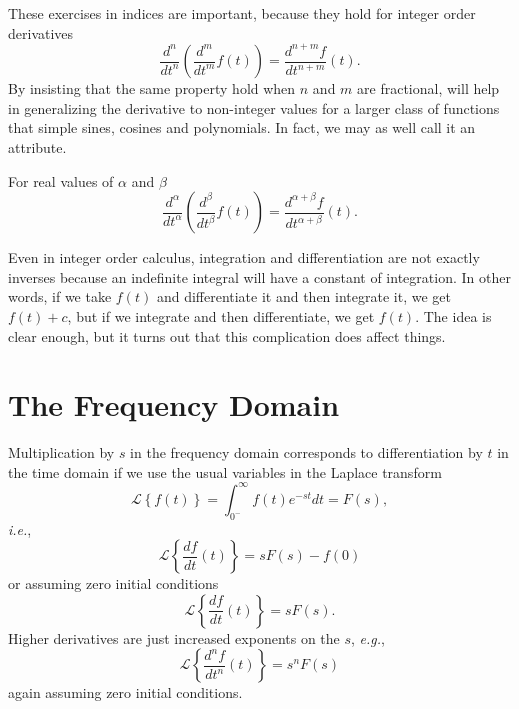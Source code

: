 These exercises in indices are important, because they hold for integer order derivatives
\begin{equation}
  \frac{d^n}{dt^n} \left( \frac{d^m}{dt^m} f(t) \right) = \frac{d^{n+m}f}{dt^{n+m}}(t).
\end{equation}
By insisting that the same property hold when $n$ and $m$ are fractional, will help in generalizing the derivative to non-integer values for a larger class of functions that simple sines, cosines and polynomials. In fact, we may as well call it an attribute.

\begin{attribute}
  For real values of $\alpha$ and $\beta$
  \begin{equation}
    \frac{d^\alpha}{dt^\alpha} \left( \frac{d^\beta}{dt^\beta} f(t) \right) = \frac{d^{\alpha + \beta}f}{dt^{\alpha + \beta}}(t).
    \label{eq:derivindices}
  \end{equation}
\end{attribute}

Even in integer order calculus, integration and differentiation are not exactly inverses because an indefinite integral will have a constant of integration. In other words, if we take $f(t)$ and differentiate it and then integrate it, we get $f(t) + c$, but if we integrate and then differentiate, we get $f(t)$. The idea is clear enough, but it turns out that this complication does affect things.


\section{The Frequency Domain}

Multiplication by $s$ in the frequency domain corresponds to differentiation by $t$ in the time domain if we use the
usual variables in the Laplace transform
\begin{equation}
  \mathcal{L} \left\{ f(t) \right\} = \int_{0^-}^\infty f(t) e^{-s t} dt = F(s),
\end{equation}
\textit{i.e.}, 
\begin{equation}
  \mathcal L \left\{ \frac{df}{dt}(t) \right\} = s F(s) - f(0)
\end{equation}
or assuming zero initial conditions
\begin{equation}
  \mathcal L \left\{ \frac{df}{dt}(t) \right\} = s F(s).
\end{equation}
Higher derivatives are just increased exponents on the $s$, \textit{e.g.}, 
\begin{equation}
  \mathcal L \left\{ \frac{d^n f}{dt^n}(t) \right\} = s^n F(s)
\end{equation}
again assuming zero initial conditions.

